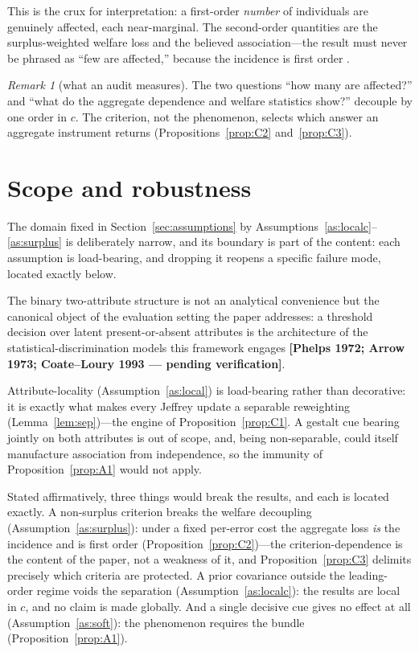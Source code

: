 \documentclass[review,12pt,authoryear]{elsarticle}
\theoremstyle{remark}
\newtheorem{remark}{Remark}
\theoremstyle{definition}
\newcommand{\anchor}[1]{}
\newcommand{\pcite}[1]{\textbf{[#1 --- pending verification]}}
\begin{document}
This is the crux for interpretation: a first-order \emph{number} of individuals are
genuinely affected, each near-marginal. The second-order quantities are the surplus-weighted
welfare loss and the believed association---the result must never be phrased as ``few are
affected,'' because the incidence is first order \anchor{Prop.~C2}.

\begin{remark}[what an audit measures]\label{rem:audit}
The two questions ``how many are affected?'' and ``what do the aggregate dependence and welfare
statistics show?'' decouple by one order in $c$. The criterion, not the phenomenon,
selects which answer an aggregate instrument returns
(Propositions~\ref{prop:C2} and~\ref{prop:C3}).
\end{remark}

\section{Scope and robustness}
\label{sec:scope}

The domain fixed in Section~\ref{sec:assumptions} by Assumptions~\ref{as:localc}--\ref{as:surplus}
is deliberately narrow, and its boundary is part of the content: each assumption is load-bearing,
and dropping it reopens a specific failure mode, located exactly below.

The binary two-attribute structure is not an analytical convenience but the canonical object of
the evaluation setting the paper addresses: a threshold decision over latent present-or-absent
attributes is the architecture of the statistical-discrimination models this framework engages
\pcite{Phelps 1972; Arrow 1973; Coate--Loury 1993}.

Attribute-locality (Assumption~\ref{as:local}) is load-bearing rather than decorative: it is exactly what makes every
Jeffrey update a separable reweighting (Lemma~\ref{lem:sep})---the engine of
Proposition~\ref{prop:C1}. A gestalt cue
bearing jointly on both attributes is out of scope, and, being non-separable, could itself
manufacture association from independence, so the immunity of Proposition~\ref{prop:A1} would
not apply.

Stated affirmatively, three things would break the results, and each is located exactly. A
non-surplus criterion breaks the welfare decoupling (Assumption~\ref{as:surplus}): under a fixed
per-error cost the aggregate loss \emph{is} the incidence and is first order
(Proposition~\ref{prop:C2})---the criterion-dependence is the content of the paper, not a
weakness of it, and Proposition~\ref{prop:C3} delimits precisely which criteria are protected. A
prior covariance outside the leading-order regime voids the separation
(Assumption~\ref{as:localc}): the results are local in $c$, and no claim is made globally. And a
single decisive cue gives no effect at all (Assumption~\ref{as:soft}): the phenomenon requires
the bundle (Proposition~\ref{prop:A1}).
\end{document}
